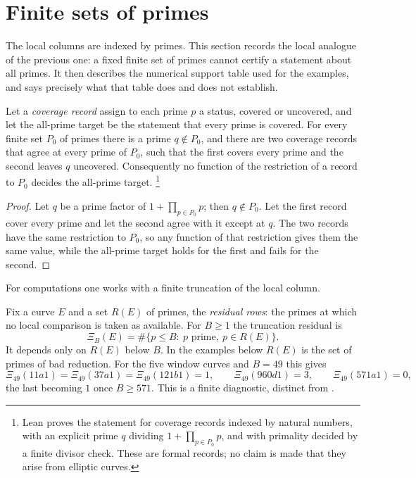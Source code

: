 \section{Finite sets of primes}
\label{sec:support-prime-no-go}

The local columns are indexed by primes.  This section records the local
analogue of the previous one: a fixed finite set of primes cannot certify
a statement about all primes.  It then describes the numerical support
table used for the examples, and says precisely what that table does and
does not establish.

\begin{theorem}\label{thm:apparatus:finite-prime-cover-no-go}
Let a \emph{coverage record} assign to each prime $p$ a status, covered or
uncovered, and let the all-prime target be the statement that every prime
is covered.  For every finite set $P_0$ of primes there is a prime
$q\notin P_0$, and there are two coverage records that agree at every
prime of $P_0$, such that the first covers every prime and the second
leaves $q$ uncovered.  Consequently no function of the restriction of a
record to $P_0$ decides the all-prime target.%
\footnote{Lean proves the statement for coverage records indexed by natural
numbers, with an explicit prime $q$ dividing $1+\prod_{p\in P_0}p$, and
with primality decided by a finite divisor check.  These are formal
records; no claim is made that they arise from elliptic curves.}
\end{theorem}

\begin{proof}
Let $q$ be a prime factor of $1+\prod_{p\in P_0}p$; then $q\notin P_0$.
Let the first record cover every prime and let the second agree with it
except at $q$.  The two records have the same restriction to $P_0$, so
any function of that restriction gives them the same value, while the
all-prime target holds for the first and fails for the second.
\end{proof}

For computations one works with a finite truncation of the local column.

\begin{definition}\label{def:apparatus:support-prime-truncation-residual}
Fix a curve $E$ and a set $R(E)$ of primes, the \emph{residual rows}: the
primes at which no local comparison is taken as available.  For $B\ge1$
the truncation residual is
\[
  \Xi_B(E)=\#\{p\le B:\ p\text{ prime},\ p\in R(E)\}.
\]
It depends only on $R(E)$ below $B$.  In the examples below $R(E)$ is the
set of primes of bad reduction.  For the five window curves and $B=49$
this gives
\[
  \Xi_{49}(11a1)=\Xi_{49}(37a1)=\Xi_{49}(121b1)=1,\qquad
  \Xi_{49}(960d1)=3,\qquad
  \Xi_{49}(571a1)=0,
\]
the last becoming $1$ once $B\ge571$.  This is a finite diagnostic,
distinct from .
\end{definition}

